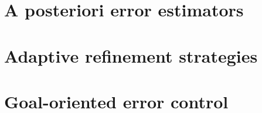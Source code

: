 \section{A posteriori error estimators}
\label{sec:error_analysis:aposteriori}


\section{Adaptive refinement strategies}
\label{sec:error_analysis:adaptive}


\section{Goal-oriented error control}
\label{sec:error_analysis:goal_oriented}

